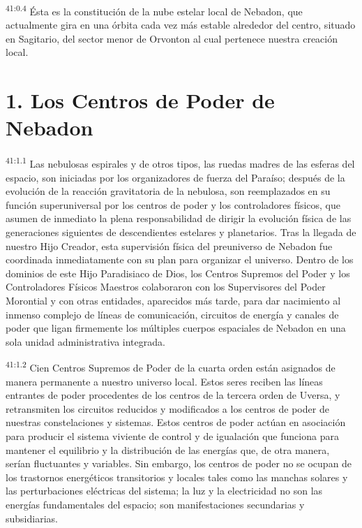 \par
\textsuperscript{41:0.4} Ésta es la constitución de la nube estelar local de Nebadon, que actualmente gira en una órbita cada vez más estable alrededor del centro, situado en Sagitario, del sector menor de Orvonton al cual pertenece nuestra creación local.

\section*{1. Los Centros de Poder de Nebadon}
\par
\textsuperscript{41:1.1} Las nebulosas espirales y de otros tipos, las ruedas madres de las esferas del espacio, son iniciadas por los organizadores de fuerza del Paraíso; después de la evolución de la reacción gravitatoria de la nebulosa, son reemplazados en su función superuniversal por los centros de poder y los controladores físicos, que asumen de inmediato la plena responsabilidad de dirigir la evolución física de las generaciones siguientes de descendientes estelares y planetarios. Tras la llegada de nuestro Hijo Creador, esta supervisión física del preuniverso de Nebadon fue coordinada inmediatamente con su plan para organizar el universo. Dentro de los dominios de este Hijo Paradisiaco de Dios, los Centros Supremos del Poder y los Controladores Físicos Maestros colaboraron con los Supervisores del Poder Morontial y con otras entidades, aparecidos más tarde, para dar nacimiento al inmenso complejo de líneas de comunicación, circuitos de energía y canales de poder que ligan firmemente los múltiples cuerpos espaciales de Nebadon en una sola unidad administrativa integrada.

\par
\textsuperscript{41:1.2} Cien Centros Supremos de Poder de la cuarta orden están asignados de manera permanente a nuestro universo local. Estos seres reciben las líneas entrantes de poder procedentes de los centros de la tercera orden de Uversa, y retransmiten los circuitos reducidos y modificados a los centros de poder de nuestras constelaciones y sistemas. Estos centros de poder actúan en asociación para producir el sistema viviente de control y de igualación que funciona para mantener el equilibrio y la distribución de las energías que, de otra manera, serían fluctuantes y variables. Sin embargo, los centros de poder no se ocupan de los trastornos energéticos transitorios y locales tales como las manchas solares y las perturbaciones eléctricas del sistema; la luz y la electricidad no son las energías fundamentales del espacio; son manifestaciones secundarias y subsidiarias.

